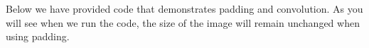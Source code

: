 \documentclass[%
oneside,                 %
final,                   %
10pt]{article}
\begin{document}
Below we have provided code that demonstrates padding and
convolution. As you will see when we run the code, the size of the
image will remain unchanged when using padding.~
\end{document}
